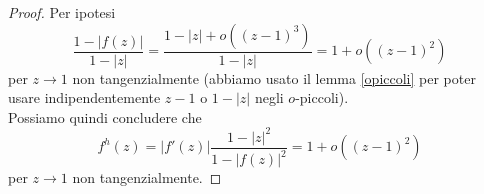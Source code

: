 \begin{proof}
  Per ipotesi
  $$\frac{1-|f(z)|}{1-|z|}=\frac{1-|z|+o((z-1)^3)}{1-|z|}=1+o((z-1)^2)$$
  per $z \longrightarrow 1$ non tangenzialmente (abbiamo usato il lemma \ref{opiccoli} per poter usare indipendentemente $z-1$ o $1-|z|$ negli $o$-piccoli). \\
  Possiamo quindi concludere che
  $$f^h(z)=|f'(z)|\frac{1-|z|^2}{1-|f(z)|^2}=1+o((z-1)^2)$$
  per $z \longrightarrow 1$ non tangenzialmente.
\end{proof}
